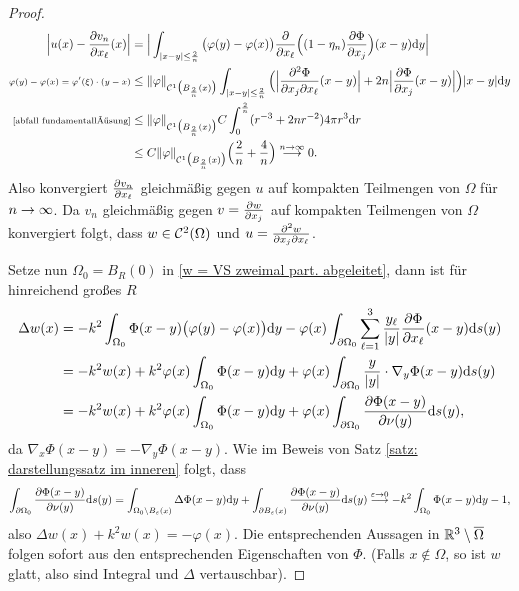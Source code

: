 \begin{proof}
	\begin{align*}
		\Big|u(x)-\frac{\partial v_n}{\partial x_\ell}(x)\Big|
		&=\Big|\int_{|x-y|\leq\frac{2}{n}}\big(\varphi(y)-\varphi(x)\big)\frac{\partial}{\partial x_\ell}\Big((1-\eta_n)\frac{\partial\Phi}{\partial x_j}\Big)(x-y)\mathrm{d}y\Big|\\
		{\text{\scriptsize\(\varphi(y)-\varphi(x)=\varphi'(\xi)\cdot(y-x)\)}}&\leq\|\varphi\|_{\mathcal{C}^1\big(B_\frac{2}{n}(x)\big)}\int_{|x-y|\leq\frac{2}{n}}\Big(\Big|\frac{\partial^2\Phi}{\partial x_j\partial x_\ell}(x-y)\Big|+2n\Big|\frac{\partial\Phi}{\partial x_j}(x-y)\Big|\Big)|x-y|\mathrm{d}y\\
		\scriptsize\eqref{abfall fundamentallösung}&\leq\|\varphi\|_{\mathcal{C}^1\big(B_\frac{2}{n}(x)\big)}C\int_0^\frac{2}{n}(r^{-3}+2nr^{-2})4\pi r^3\mathrm{d}r\\
		&\leq C\|\varphi\|_{\mathcal{C}^1\big(B_\frac{2}{n}(x)\big)}\Big(\frac{2}{n}+\frac{4}{n}\Big)\overset{n\rightarrow\infty}{\longrightarrow}0.
	\end{align*}
	Also konvergiert \(\frac{\partial v_n}{\partial x_\ell}\) gleichmäßig gegen \(u\) auf kompakten Teilmengen von \(\Omega\) für \(n\rightarrow\infty\). Da \(v_n\) gleichmäßig gegen \(v=\frac{\partial w}{\partial x_j}\) auf kompakten Teilmengen von \(\Omega\) konvergiert folgt, dass \(w\in\mathcal{C}^2(\Omega)\) und \(u=\frac{\partial^2w}{\partial x_j\partial x_\ell}\).
	
	Setze nun \(\Omega_0=B_R(0)\) in \eqref{w = VS zweimal part. abgeleitet}, dann ist für hinreichend großes \(R\)
	\begin{align*}
		\Delta w(x)&=-k^2\int_{\Omega_0}\Phi(x-y)\big(\varphi(y)-\varphi(x)\big)\mathrm{d}y-\varphi(x)\int_{\partial\Omega_0}\sum_{\ell=1}^3\frac{y_\ell}{|y|}\frac{\partial\Phi}{\partial x_\ell}(x-y)\mathrm{d}s(y)\\
		&=-k^2w(x)+k^2\varphi(x)\int_{\Omega_0}\Phi(x-y)\mathrm{d}y+\varphi(x)\int_{\partial\Omega_0}\frac{y}{|y|}\cdot\nabla_y\Phi(x-y)\mathrm{d}s(y)\\
		&=-k^2w(x)+k^2\varphi(x)\int_{\Omega_0}\Phi(x-y)\mathrm{d}y+\varphi(x)\int_{\partial\Omega_0}\frac{\partial\Phi(x-y)}{\partial\nu(y)}\mathrm{d}s(y),
	\end{align*}
	da \(\nabla_x\Phi(x-y)=-\nabla_y\Phi(x-y)\). Wie im Beweis von Satz \ref{satz: darstellungssatz im inneren} folgt, dass 
	\begin{equation*}
		\int_{\partial\Omega_0}\frac{\partial\Phi(x-y)}{\partial\nu(y)}\mathrm{d}s(y)=\int_{\Omega_0\setminus B_\varepsilon(x)}\Delta\Phi(x-y)\mathrm{d}y+\int_{\partial B_\varepsilon(x)}\frac{\partial\Phi(x-y)}{\partial\nu(y)}\mathrm{d}s(y)\overset{\varepsilon\rightarrow0}{\longrightarrow}-k^2\int_{\Omega_0}\Phi(x-y)\mathrm{d}y-1,
	\end{equation*}
	also \(\Delta w(x)+k^2w(x)=-\varphi(x)\). Die entsprechenden Aussagen in \(\mathbb{R}^3\setminus\overline{\Omega}\) folgen sofort aus den entsprechenden Eigenschaften von \(\Phi\). (Falls \(x\notin\Omega\), so ist \(w\) glatt, also sind Integral und \(\Delta\) vertauschbar).
\end{proof}
